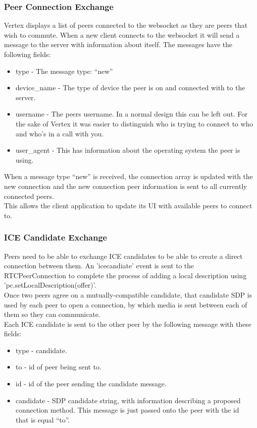 \subsubsection{Peer Connection Exchange}
Vertex displays a list of peers connected to the websocket as they are peers that wish to commute. When a new client connects to the websocket it will send a message to the server with information about itself. The messages have the following fields:
\begin{itemize}
    \item type - The message type: “new”
    \item device\_name - The type of device the peer is on and connected with to the server.
    \item username - The peers username. In a normal design this can be left out. For the sake of Vertex it was easier to distinguish who is trying to connect to who and who's in a call with you.
    \item user\_agent - This has information about the operating system the peer is using.
\end{itemize}
When a message type “new” is received, the connection array is updated with the new connection and the new connection peer information is sent to all currently connected peers.
\\ This allows the client application to update its UI with available peers to connect to. 

\subsubsection{ICE Candidate Exchange}
Peers need to be able to exchange ICE candidates to be able to create a direct connection between them. An 'icecandiate' event is sent to the RTCPeerConnection to complete the process of adding a local description using 'pc.setLocalDescription(offer)'.
\\ Once two peers agree on a mutually-compatible candidate, that candidate SDP is used by each peer to open a connection, by which media is sent between each of them so they can communicate.
\\ Each ICE candidate is sent to the other peer by the following message with these fields: 
\begin{itemize}
    \item type - candidate.
    \item to - id of peer being sent to.
    \item id - id of the peer sending the candidate message.
    \item candidate - SDP candidate string, with information describing a proposed connection method. This message is just passed onto the peer with the id that is equal “to”.
\end{itemize}

